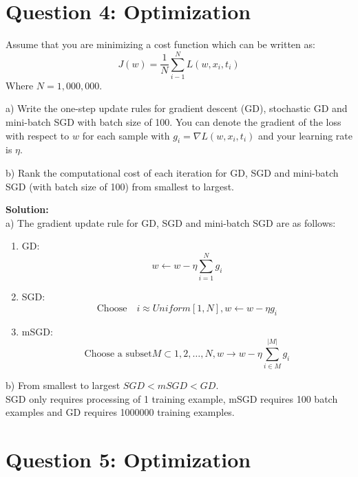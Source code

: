 \documentclass[12pt]{article}
\begin{document}
	\section*{Question 4: Optimization}
	Assume that you are minimizing a cost function which can be written as:
	\begin{equation}
		J(w) = \frac{1}{N} \sum_{i-1}^{N} L(w, x_i, t_i)
	\end{equation}
	Where $N=1,000,000$.
	
	a) Write the one-step update rules for gradient descent (GD), stochastic GD and mini-batch SGD with batch size of 100. You can denote the gradient of the loss with respect to $w$ for each sample with $g_i = \nabla L(w,x_i,t_i)$ and your learning rate is $\eta$.
	
	b) Rank the computational cost of each iteration for GD, SGD and mini-batch SGD (with batch size of 100) from smallest to largest.
	
	\begin{framed}
		\textbf{Solution:}\\
		a) The gradient update rule for GD, SGD and mini-batch SGD are as follows:
		\begin{enumerate}
			\item{GD:}
			\begin{equation}
				w \leftarrow w - \eta \sum_{i=1}^{N} g_i
			\end{equation}
			\item{SGD:}
			\begin{equation}
				\text{Choose} \quad i \approx Uniform[1,N], w \leftarrow w - \eta g_i
			\end{equation}
			\item{mSGD:}
			\begin{equation}
				\text{Choose a subset} M \subset  {1,2, \dots , N}, w \rightarrow w - \eta \sum_{i \in M}^{|M|}g_i
			\end{equation}
		\end{enumerate}
		
		b) From smallest to largest $SGD < mSGD < GD$.\\
		SGD only requires processing of 1 training example, mSGD requires 100 batch examples and GD requires 1000000 training examples.
	\end{framed}
	
	\section*{Question 5: Optimization}
	
\end{document}

